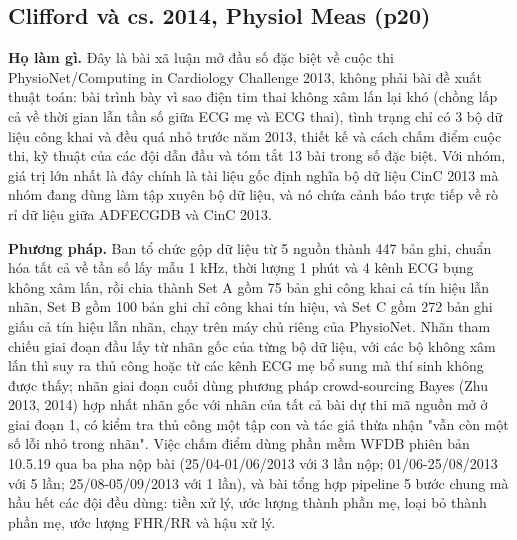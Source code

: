\documentclass[12pt,a4paper]{article}
\begin{document}
\subsection{Clifford và cs. 2014, Physiol Meas \normalfont\small (p20)}
\par\vspace{2pt}
\par\vspace{4pt}
\noindent \textbf{Họ làm gì.} Đây là bài xã luận mở đầu số đặc biệt về cuộc thi PhysioNet/Computing in Cardiology Challenge 2013, không phải bài đề xuất thuật toán: bài trình bày vì sao điện tim thai không xâm lấn lại khó (chồng lấp cả về thời gian lẫn tần số giữa ECG mẹ và ECG thai), tình trạng chỉ có 3 bộ dữ liệu công khai và đều quá nhỏ trước năm 2013, thiết kế và cách chấm điểm cuộc thi, kỹ thuật của các đội dẫn đầu và tóm tắt 13 bài trong số đặc biệt. Với nhóm, giá trị lớn nhất là đây chính là tài liệu gốc định nghĩa bộ dữ liệu CinC 2013 mà nhóm đang dùng làm tập xuyên bộ dữ liệu, và nó chứa cảnh báo trực tiếp về rò rỉ dữ liệu giữa ADFECGDB và CinC 2013.\par\vspace{3pt}
\noindent \textbf{Phương pháp.} Ban tổ chức gộp dữ liệu từ 5 nguồn thành 447 bản ghi, chuẩn hóa tất cả về tần số lấy mẫu 1 kHz, thời lượng 1 phút và 4 kênh ECG bụng không xâm lấn, rồi chia thành Set A gồm 75 bản ghi công khai cả tín hiệu lẫn nhãn, Set B gồm 100 bản ghi chỉ công khai tín hiệu, và Set C gồm 272 bản ghi giấu cả tín hiệu lẫn nhãn, chạy trên máy chủ riêng của PhysioNet. Nhãn tham chiếu giai đoạn đầu lấy từ nhãn gốc của từng bộ dữ liệu, với các bộ không xâm lấn thì suy ra thủ công hoặc từ các kênh ECG mẹ bổ sung mà thí sinh không được thấy; nhãn giai đoạn cuối dùng phương pháp crowd-sourcing Bayes (Zhu 2013, 2014) hợp nhất nhãn gốc với nhãn của tất cả bài dự thi mã nguồn mở ở giai đoạn 1, có kiểm tra thủ công một tập con và tác giả thừa nhận "vẫn còn một số lỗi nhỏ trong nhãn". Việc chấm điểm dùng phần mềm WFDB phiên bản 10.5.19 qua ba pha nộp bài (25/04-01/06/2013 với 3 lần nộp; 01/06-25/08/2013 với 5 lần; 25/08-05/09/2013 với 1 lần), và bài tổng hợp pipeline 5 bước chung mà hầu hết các đội đều dùng: tiền xử lý, ước lượng thành phần mẹ, loại bỏ thành phần mẹ, ước lượng FHR/RR và hậu xử lý.\par\vspace{3pt}
\end{document}
